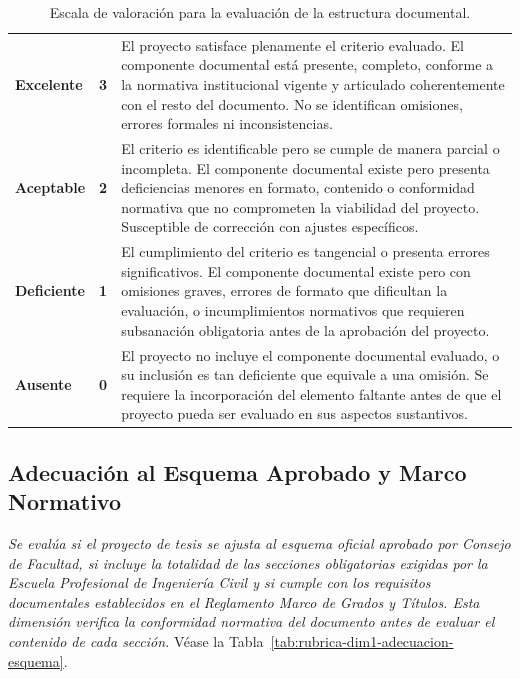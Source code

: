 \vspace{-10pt}
\begin{table}[htbp]
\centering
\scriptsize
\caption{Escala de valoración para la evaluación de la estructura documental.}
\label{tab:escala-estructura-documental}
\begin{tabularx}{\textwidth}{|C{1.8cm}|C{.6cm}|X|}
\hline
{}
 &  &  \\ \hline
\textcolor{csuf}{\textbf{Excelente}} & \textbf{3} & El proyecto satisface plenamente el criterio evaluado. El componente documental está presente, completo, conforme a la normativa institucional vigente y articulado coherentemente con el resto del documento. No se identifican omisiones, errores formales ni inconsistencias. \\ \hline
{}
\textcolor{cace}{\textbf{Aceptable}} & \textbf{2} & El criterio es identificable pero se cumple de manera parcial o incompleta. El componente documental existe pero presenta deficiencias menores en formato, contenido o conformidad normativa que no comprometen la viabilidad del proyecto. Susceptible de corrección con ajustes específicos. \\ \hline
\textcolor{cdef}{\textbf{Deficiente}} & \textbf{1} & El cumplimiento del criterio es tangencial o presenta errores significativos. El componente documental existe pero con omisiones graves, errores de formato que dificultan la evaluación, o incumplimientos normativos que requieren subsanación obligatoria antes de la aprobación del proyecto. \\ \hline
{}
\textcolor{cins}{\textbf{Ausente}} & \textbf{0} & El proyecto no incluye el componente documental evaluado, o su inclusión es tan deficiente que equivale a una omisión. Se requiere la incorporación del elemento faltante antes de que el proyecto pueda ser evaluado en sus aspectos sustantivos. \\ \hline
\end{tabularx}
\end{table}

\clearpage
\subsection{Adecuación al Esquema Aprobado y Marco Normativo}
\textit{Se evalúa si el proyecto de tesis se ajusta al esquema oficial aprobado por Consejo de Facultad, si incluye la totalidad de las secciones obligatorias exigidas por la Escuela Profesional de Ingeniería Civil y si cumple con los requisitos documentales establecidos en el Reglamento Marco de Grados y Títulos. Esta dimensión verifica la conformidad normativa del documento antes de evaluar el contenido de cada sección.} Véase la Tabla~\ref{tab:rubrica-dim1-adecuacion-esquema}.

